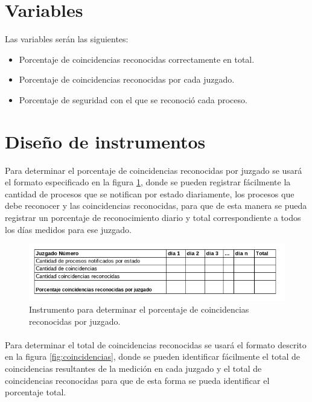 \section{Variables}
Las variables ser\'an las siguientes:
\begin{itemize}
\item Porcentaje de coincidencias reconocidas correctamente en total.
\item Porcentaje de coincidencias reconocidas por cada juzgado.
\item Porcentaje de seguridad con el que se reconoci\'o cada proceso.

\end{itemize}
\section{Dise\~no de instrumentos}
Para determinar el porcentaje de coincidencias reconocidas por juzgado 
se usar\'a el formato especificado en la figura \ref{fig:coincidencias_por_juzgado}, 
donde se pueden registrar f\'acilmente la cantidad de procesos que se 
notifican por estado diariamente, los procesos que debe reconocer y las
coincidencias reconocidas, para que de esta manera se pueda registrar un
porcentaje de reconocimiento diario y total correspondiente a todos los 
d\'ias medidos para ese juzgado. 

\begin{figure}[h]
\begin{center}
\includegraphics[scale=0.7]{./porcentaje_coincidencias_por_juzgado.png}
\end{center}
{\caption{Instrumento para determinar el porcentaje de coincidencias reconocidas por juzgado.}\label{fig:coincidencias_por_juzgado}}
\end{figure}

\paragraph{}
Para determinar el total de coincidencias reconocidas se usar\'a el 
formato descrito en la figura \ref{fig:coincidencias}, donde se pueden identificar f\'acilmente 
el total de coincidencias resultantes de la medici\'on en cada juzgado y
el total de coincidencias reconocidas para que de esta forma se pueda 
identificar el porcentaje total.

